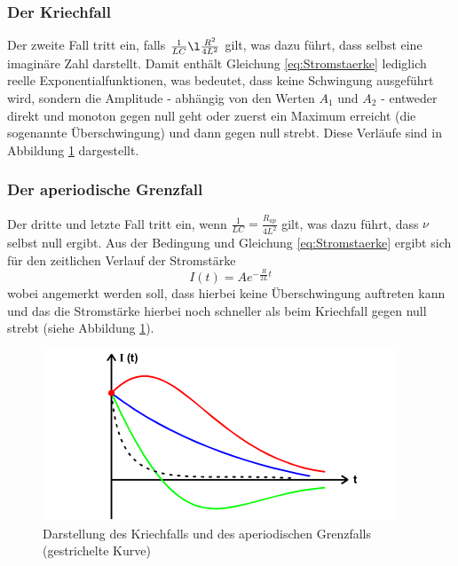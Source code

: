 \subsubsection{Der Kriechfall}

Der zweite Fall tritt ein, falls $\frac{1}{LC} \l \frac{R^{2}}{4L^{2}}$ gilt, was dazu führt, 
dass \nu selbst eine imaginäre Zahl darstellt. Damit enthält Gleichung \ref{eq:Stromstaerke}
lediglich reelle Exponentialfunktionen, was bedeutet, dass keine Schwingung ausgeführt wird, 
sondern die Amplitude - abhängig von den Werten $A_1$ und $A_2$ - entweder direkt und 
monoton gegen null geht oder zuerst ein Maximum erreicht (die sogenannte Überschwingung) 
und dann gegen null strebt. Diese Verläufe sind in Abbildung \ref{fig:fvs} dargestellt.


\subsubsection{Der aperiodische Grenzfall}

Der dritte und letzte Fall tritt ein, wenn $\frac{1}{LC} = \frac{R_{ap}}{4L^{2}}$ gilt, was dazu
führt, dass $\nu$ selbst null ergibt. Aus der Bedingung und Gleichung \ref{eq:Stromstaerke} ergibt
sich für den zeitlichen Verlauf der Stromstärke 
\begin{equation*}
    I(t) = A e^{-\frac{R}{2L}t}
\end{equation*}
\noindent wobei angemerkt werden soll, dass hierbei keine Überschwingung auftreten kann und 
das die Stromstärke hierbei noch schneller als beim Kriechfall gegen null strebt (siehe Abbildung \ref{fig:fvs}). 

\begin{figure}[H]
  \centering
  \includegraphics{content/faellevonschwingungen.png}
  \caption{Darstellung des Kriechfalls und des aperiodischen Grenzfalls (gestrichelte Kurve)}
  \label{fig:fvs}
\end{figure}









